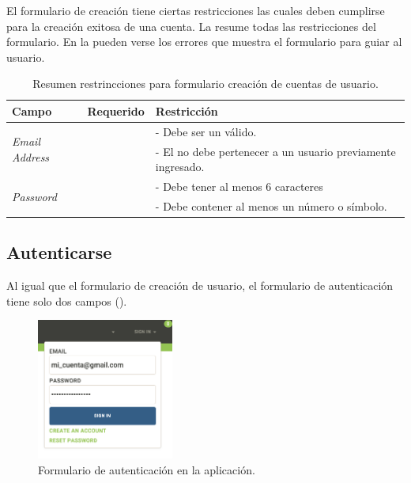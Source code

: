 El formulario de creación tiene ciertas restricciones las cuales deben cumplirse para la creación exitosa de una cuenta. La  resume todas las restricciones del formulario. En la  pueden verse los errores que muestra el formulario para guiar al usuario.

\begin{table}[H]
    \centering
	\begin{tabular}{ |l|c||l| }
		\hline Campo & Requerido & Restricción \\ \hline
		\multirow{2}{*}{\textit{Email Address}} &  \multirow{2}{*}{\checkmark}
				& - Debe ser un \email válido. \\ 
			& 	& - El \email no debe pertenecer a un usuario previamente ingresado.\\ \hline
		\multirow{2}{*}{\textit{Password}} 		&  \multirow{2}{*}{\checkmark}	
				& - Debe tener al menos 6 caracteres \\ 
			& 	& - Debe contener al menos un número o símbolo. \\ \hline
	\end{tabular}
 	\caption{Resumen restrincciones para formulario creación de cuentas de usuario.}
    \label{tab:architecture:accounts:new:form}
\end{table}

\subsection{Autenticarse}

Al igual que el formulario de creación de usuario, el formulario de autenticación tiene solo dos campos ().

\begin{figure}[H]
	\centering
	\includegraphics[width=0.4\textwidth]{figuras/architecture/accounts/signin/form.png}
	\caption{Formulario de autenticación en la aplicación.}
	\label{figure:architecture:accounts:signin:form}
\end{figure}

